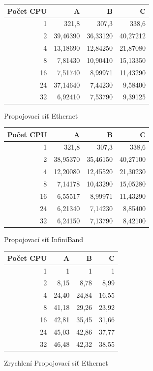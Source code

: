 \documentclass[12pt]{article}
\begin{document}
\begin{figure}[h]
\caption{Propojovací síť Ethernet}
\begin{center}
\begin{tabular}{|r|r|r|r|}
\hline
Počet CPU & A & B & C\\
\hline
1 & 321,8 & 307,3 & 338,6\\
\hline
2 & 39,46390 & 36,33120 & 40,27212\\
\hline
4 & 13,18690 & 12,84250 & 21,87080\\
\hline
8 & 7,81430 & 10,90410 & 15,13350\\
\hline
16 & 7,51740 & 8,99971 & 11,43290\\
\hline
24 & 37,14640 & 7,44230 & 9,58400\\
\hline
32 & 6,92410 & 7,53790 & 9,39125\\
\hline
\end{tabular}
\end{center}
\end{figure}

\begin{figure}[h]
 \caption{Propojovací síť InfiniBand}
\begin{center}
\begin{tabular}{|r|r|r|r|}
\hline
Počet CPU & A & B & C\\
\hline
1 & 321,8 & 307,3 & 338,6\\
\hline
2 & 38,95370 & 35,46150 & 40,27100\\
\hline
4 & 12,20080 & 12,45520 & 21,30230\\
\hline
8 & 7,14178 & 10,43290 & 15,05280\\
\hline
16 & 6,55517 & 8,99971 & 11,43290\\
\hline
24 & 6,21340 & 7,14230 & 8,85400\\
\hline
32 & 6,24150 & 7,13790 & 8,42100\\
\hline
\end{tabular} 
\end{center}
\end{figure}

\begin{figure}[h]
 \caption{Zrychlení Propojovací síť Ethernet}
\begin{center}
\begin{tabular}{|r|r|r|r|}
\hline
Počet CPU & A & B & C\\
\hline
1 & 1 & 1 & 1\\
\hline
2 & 8,15 & 8,78 & 8,99\\
\hline
4 & 24,40 & 24,84 & 16,55\\
\hline
8 & 41,18 & 29,26 & 23,92\\
\hline
16 & 42,81 & 35,45 & 31,66\\
\hline
24 & 45,03 & 42,86 & 37,77\\
\hline
32 & 46,48 & 42,32 & 38,55\\
\hline
\end{tabular}
\end{center}
\end{figure}
\end{document}
